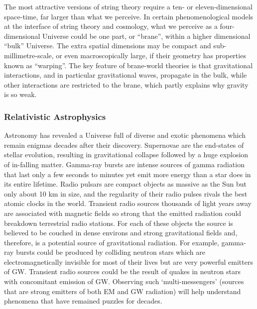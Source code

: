 The most attractive versions of string theory require a ten- or
eleven-dimensional space-time, far larger than what we perceive. 
In certain phenomenological models at the interface of string 
theory and cosmology, what we perceive as a four-dimensional 
Universe could be one part, or ``brane'', within a higher 
dimensional ``bulk'' Universe. The extra spatial dimensions may 
be compact and sub-millimetre-scale, 
or even macroscopically large, if their geometry has 
properties known as ``warping''. The key feature of brane-world 
theories is that gravitational interactions, and in particular 
gravitational waves, propagate in the bulk, while other interactions 
are restricted to the brane, which partly explains why gravity is 
so weak. 

\FloatBarrier
\subsubsection{Relativistic Astrophysics}
Astronomy has revealed a Universe full of diverse and exotic
phenomena which remain enigmas decades after their discovery. 
Supernovae are the end-states of stellar evolution, resulting in 
gravitational collapse followed by a huge explosion of in-falling matter.
Gamma-ray bursts are intense sources of gamma radiation that last 
only a few seconds to minutes yet emit more energy than a star does 
in its entire lifetime. 
Radio pulsars are compact objects as massive as the Sun but only 
about 10 km in size, and the regularity of their radio pulses rivals 
the best atomic clocks in the world. 
Transient radio sources thousands of light years away 
are associated with magnetic fields so strong that the emitted radiation 
could breakdown terrestrial radio stations. 
%
For each of these objects the source is believed to be couched in 
dense environs and strong gravitational fields and, therefore, 
is a potential source of gravitational radiation. For example, gamma-ray 
bursts could be produced by colliding neutron stars which are 
electromagnetically invisible for most of their lives but are very 
powerful emitters of GW. Transient radio sources could be the 
result of quakes in neutron stars with concomitant emission of GW. 
Observing such `multi-messengers' (sources that are strong emitters of 
both EM and GW radiation) will help understand phenomena that 
have remained puzzles for decades.

